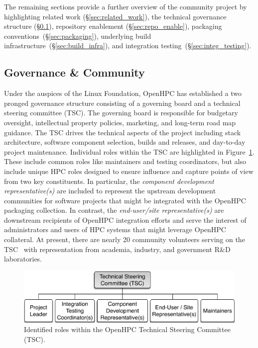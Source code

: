 \documentclass{sig-alternate-05-2015}
\begin{document}
The remaining sections provide a further overview of the community project
by highlighting related work (\S\ref{sec:related_work}), the technical governance
structure (\S\ref{sec:governance}), repository enablement (\S\ref{sec:repo_enable}), packaging
conventions~(\S\ref{sec:packaging}), underlying build
infrastructure~(\S\ref{sec:build_infra}), and integration testing~(\S\ref{sec:integ_testing}).




\subsection{Governance \& Community} \label{sec:governance}
Under the auspices of the Linux Foundation, OpenHPC has established a two
pronged governance structure consisting of a governing board and a technical
steering committee (TSC). The governing board is responsible for budgetary
oversight, intellectual property policies, marketing, and long-term road map
guidance. The TSC drives the technical aspects of the project including stack
architecture, software component selection, builds and releases, and day-to-day
project maintenance. Individual roles within the TSC are highlighted in
Figure~\ref{fig:tsc_governance}.  These include common roles like maintainers
and testing coordinators, but also include unique HPC roles designed to ensure
influence and capture points of view from two key constituents. In particular,
the {\em component development representative(s)} are included to represent the
upstream development communities for software projects that might be integrated
with the OpenHPC packaging collection. In contrast, the {\em end-user/site
  representative(s)} are downstream recipients of OpenHPC integration efforts
and serve the interest of administrators and users of HPC systems that might leverage
OpenHPC collateral.  At present, there are nearly 20 community volunteers
serving on the TSC~\cite{TSC_url} with representation from academia, industry,
and government R\&D laboratories.


\begin{figure}
  \includegraphics[width=1.0\linewidth]{figures/governance}
  \caption{Identified roles within the OpenHPC Technical Steering Committee (TSC).}
  \label{fig:tsc_governance}
\end{figure}
\end{document}
